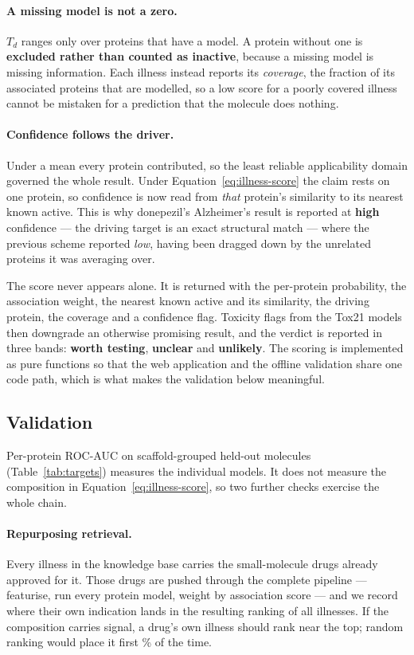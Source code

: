 \paragraph{A missing model is not a zero.} $T_d$ ranges only over proteins that have a model. A
protein without one is \textbf{excluded rather than counted as inactive}, because a missing model
is missing information. Each illness instead reports its \emph{coverage}, the fraction of its
associated proteins that are modelled, so a low score for a poorly covered illness cannot be
mistaken for a prediction that the molecule does nothing.

\paragraph{Confidence follows the driver.} Under a mean every protein contributed, so the least
reliable applicability domain governed the whole result. Under Equation~\ref{eq:illness-score} the
claim rests on one protein, so confidence is now read from \emph{that} protein's similarity to its
nearest known active. This is why donepezil's Alzheimer's result is reported at \textbf{high}
confidence --- the driving target is an exact structural match --- where the previous scheme
reported \emph{low}, having been dragged down by the unrelated proteins it was averaging over.

The score never appears alone. It is returned with the per-protein probability, the association
weight, the nearest known active and its similarity, the driving protein, the coverage and a
confidence flag. Toxicity flags from the Tox21 models then downgrade an otherwise promising
result, and the verdict is reported in three bands: \textbf{worth testing}, \textbf{unclear} and
\textbf{unlikely}. The scoring is implemented as pure functions so that the web application and
the offline validation share one code path, which is what makes the validation below meaningful.

\subsection{Validation}

Per-protein ROC-AUC on scaffold-grouped held-out molecules (Table~\ref{tab:targets}) measures the
individual models. It does not measure the composition in Equation~\ref{eq:illness-score}, so two
further checks exercise the whole chain.

\paragraph{Repurposing retrieval.} Every illness in the knowledge base carries the small-molecule
drugs already approved for it. Those drugs are pushed through the complete pipeline --- featurise,
run every protein model, weight by association score --- and we record where their own indication
lands in the resulting ranking of all \TgtNDiseases{} illnesses. If the composition carries
signal, a drug's own illness should rank near the top; random ranking would place it first
\TgtValRandom\% of the time.

